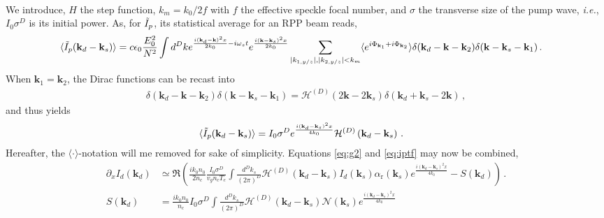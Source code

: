 \documentclass[
 reprint,
 amsmath,amssymb,
 aps,
]{revtex4-1}
\begin{document}
\begin{widetext}
\begin{align}
   \end{align}
We introduce,  $H$ the step function, $k_m=k_0/2f$ with $f$ the effective speckle focal number,  and $\sigma$ the transverse size of the pump wave, \emph{i.e.}, $I_0\sigma^D$ is its initial power.
As, for $\Tilde{I}_p$, its statistical average for an RPP beam reads, 
\begin{align}
\langle \Tilde{I}_p(\mathbf{k}_d-\mathbf{k}_s)\rangle   &=  c\epsilon_0\frac{E_0^2}{N^2}  \int d^Dk 
e^{\frac{ i (\mathbf{k}_d-\mathbf{k})^2x}{2k_0}-i\omega_s t}
e^{\frac{ i(\mathbf{k}-\mathbf{k}_s)^2x}{2k_0}}  
\sum_{\vert k_{1,y/z}\vert,\vert k_{2,y/z}\vert  <k_m}
\langle e^{i\Phi_{\mathbf{k}_1}+i\Phi_{\mathbf{k}_2}}\rangle
\delta(\mathbf{k}_d-\mathbf{k} -\mathbf{k}_2 ) 
\delta(\mathbf{k}-\mathbf{k}_s -\mathbf{k}_1) 
\, . \label{eq:ipt2} 
\end{align}
When  $\mathbf{k}_1=\mathbf{k}_2$, the Dirac functions can be recast into 
\begin{align}
\delta(\mathbf{k}_d-\mathbf{k} -\mathbf{k}_2 ) 
\delta(\mathbf{k}-\mathbf{k}_s -\mathbf{k}_1)= \mathcal{H}^{(D)}(2\mathbf{k}-2\mathbf{k}_s  )  \delta (\mathbf{k}_d+\mathbf{k}_s -2\mathbf{k} ) \, ,
\end{align}
and thus yields
\begin{align}
\langle \Tilde{I}_p(\mathbf{k}_d-\mathbf{k}_s)\rangle   &=  I_0\sigma^D
e^{\frac{ i(\mathbf{k}_d-\mathbf{k}_s)^2x}{4k_0}}  
\mathcal{H}^{(D)}\left( \mathbf{k}_d-\mathbf{k}_s  \right)
\, . \label{eq:iptf} 
\end{align}
Hereafter, the $\langle  \cdot \rangle$-notation will  me removed for sake of simplicity. 
Equations \eqref{eq:g2} and \eqref{eq:iptf} may now be combined,  
  \begin{align}
\partial_xI_d(\mathbf{k}_d)&\simeq  \Re\left( \frac{ik_0n_0}{2n_c} \frac{ I_0\sigma^D }{  v_g n_c T_e}   
 \int \frac{d^Dk_s}{(2\pi)^D}   \mathcal{H}^{(D)}(\mathbf{k}_d-\mathbf{k}_s) I_d(\mathbf{k}_s) \alpha_\mathrm{r}(\mathbf{k}_s) e^{\frac{ i(\mathbf{k}_d-\mathbf{k}_s)^2x}{4k_0}}  -S(\mathbf{k}_d) \right)
\, . \label{eq:g4}\\
S(\mathbf{k}_d) &=   \frac{ik_0n_0}{n_c} I_0\sigma^D\int \frac{d^Dk_s}{(2\pi)^D}  \mathcal{H}^{(D)}\left( \mathbf{k}_d-\mathbf{k}_s  \right)
\mathcal{N}(\mathbf{k}_s) e^{\frac{ i(\mathbf{k}_d-\mathbf{k}_s)^2x}{4k_0}}  
\end{align}


\end{widetext}
\end{document}
